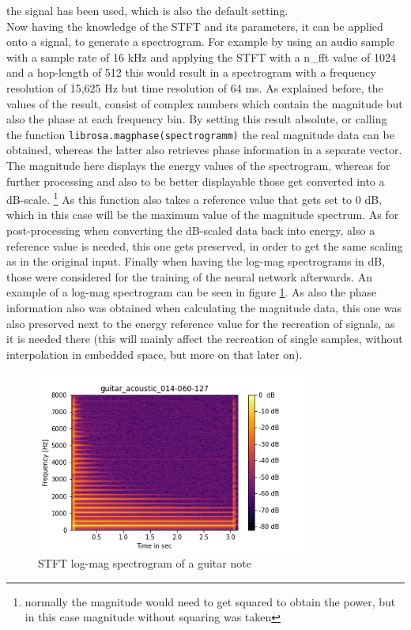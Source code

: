 the signal has been used, which is also the default setting.\\

Now having the knowledge of the STFT and its parameters, it can be applied onto a signal, to generate a spectrogram. For example by using an audio sample with a sample rate of 16 kHz and applying the STFT with a n\_fft value of 1024 and a hop-length of 512 this would result in a spectrogram with a frequency resolution of 15,625 Hz but time resolution of 64 ms. As explained before, the values of the result, consist of complex numbers which contain the magnitude but also the phase at each frequency bin. By setting this result absolute, or calling the function \texttt{librosa.magphase(spectrogramm)} the real magnitude data can be obtained, whereas the latter also retrieves phase information in a separate vector. The magnitude here displays the energy values of the spectrogram, whereas for further processing and also to be better displayable those get converted into a dB-scale. \footnote{normally the magnitude would need to get squared to obtain the power, but in this case magnitude without squaring was taken} As this function also takes a reference value that gets set to 0 dB, which in this case will be the maximum value of the magnitude spectrum. As for post-processing when converting the dB-scaled data back into energy, also a reference value is needed, this one gets preserved, in order to get the same scaling as in the original input. Finally when having the log-mag spectrograms in dB, those were considered for the training of the neural network afterwards. An example of a log-mag spectrogram can be seen in figure \ref{fig:spectrogram}. As also the phase information also was obtained when calculating the magnitude data, this one was also preserved next to the energy reference value for the recreation of signals, as it is needed there (this will mainly affect the recreation of single samples, without interpolation in embedded space, but more on that later on).


 \begin{figure}[htb!]
	\caption{STFT log-mag spectrogram of a guitar note}
	\label{fig:spectrogram}
	\centering
	\includegraphics[width=0.8\textwidth]{images/approach/guitar_acoustic_014-060-127.png}
\end{figure}

